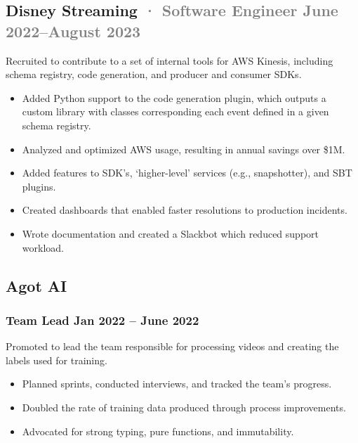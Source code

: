 \documentclass[12pt]{article} %
\providecommand{\tightlist}{%
  \setlength{\itemsep}{0pt}\setlength{\parskip}{0pt}}
\renewcommand{\emph}[1]{%
  \textcolor{gray}{#1}%
}
\begin{document}
\hypertarget{disney-streaming-software-engineer-june-2022august-2023}{%
\subsection{\texorpdfstring{Disney Streaming \emph{· \small Software
Engineer \hfill June 2022--August
2023}}{Disney Streaming · Software Engineer June 2022--August 2023}}\label{disney-streaming-software-engineer-june-2022august-2023}}

Recruited to contribute to a set of internal tools for AWS Kinesis,
including schema registry, code generation, and producer and consumer
SDKs.

\begin{itemize}
\tightlist
\item
  Added Python support to the code generation plugin, which outputs a
  custom library with classes corresponding each event defined in a
  given schema registry.
\item
  Analyzed and optimized AWS usage, resulting in annual savings over
  \$1M.
\item
  Added features to SDK's, `higher-level' services (e.g., snapshotter),
  and SBT plugins.
\item
  Created dashboards that enabled faster resolutions to production
  incidents.
\item
  Wrote documentation and created a Slackbot which reduced support
  workload.
\end{itemize}

\hypertarget{agot-ai}{%
\subsection{Agot AI}\label{agot-ai}}

\vspace{-5pt}

\hypertarget{team-lead-jan-2022-june-2022}{%
\subsubsection{\texorpdfstring{\small Team Lead \hfill Jan 2022 -- June
2022}{Team Lead Jan 2022 -- June 2022}}\label{team-lead-jan-2022-june-2022}}

Promoted to lead the team responsible for processing videos and creating
the labels used for training.

\begin{itemize}
\tightlist
\item
  Planned sprints, conducted interviews, and tracked the team's
  progress.
\item
  Doubled the rate of training data produced through process
  improvements.
\item
  Advocated for strong typing, pure functions, and immutability.
\end{itemize}
\end{document}
